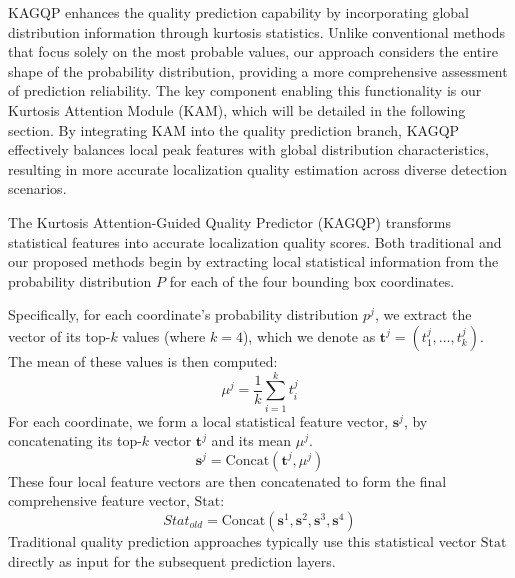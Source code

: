 KAGQP enhances the quality prediction capability by incorporating global distribution information through kurtosis statistics. Unlike conventional methods that focus solely on the most probable values, our approach considers the entire shape of the probability distribution, providing a more comprehensive assessment of prediction reliability. The key component enabling this functionality is our Kurtosis Attention Module (KAM), which will be detailed in the following section. By integrating KAM into the quality prediction branch, KAGQP effectively balances local peak features with global distribution characteristics, resulting in more accurate localization quality estimation across diverse detection scenarios.

The Kurtosis Attention-Guided Quality Predictor (KAGQP) transforms statistical features into accurate localization quality scores. Both traditional and our proposed methods begin by extracting local statistical information from the probability distribution $P$ for each of the four bounding box coordinates.



Specifically, for each coordinate's probability distribution $p^j$, we extract the vector of its top-$k$ values (where $k=4$), which we denote as $\mathbf{t}^j = (t^j_1, \dots, t^j_k)$. The mean of these values is then computed:
\begin{equation}
\mu^j = \frac{1}{k}\sum_{i=1}^{k}t^j_i
\end{equation}
For each coordinate, we form a local statistical feature vector, $\mathbf{s}^j$, by concatenating its top-$k$ vector $\mathbf{t}^j$ and its mean $\mu^j$.
\begin{equation}
\mathbf{s}^j = \text{Concat}(\mathbf{t}^j, \mu^j)
\end{equation}
These four local feature vectors are then concatenated to form the final comprehensive feature vector, $\text{Stat}$:
\begin{equation}
Stat_{old} = \text{Concat}(\mathbf{s}^1, \mathbf{s}^2, \mathbf{s}^3, \mathbf{s}^4)
\end{equation}
Traditional quality prediction approaches typically use this statistical vector $\text{Stat}$ directly as input for the subsequent prediction layers.


